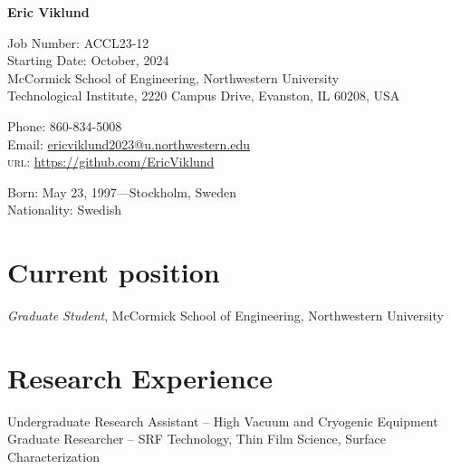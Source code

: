 \documentclass[11pt]{article} %
\begin{document}

{\LARGE\bfseries Eric Viklund} %
\bigskip\medskip %

Job Number: ACCL23-12\\
Starting Date: October, 2024\\

McCormick School of Engineering,  Northwestern University\\ %
Technological Institute, 2220 Campus Drive, Evanston, IL 60208, USA
\medskip %

Phone: 860-834-5008\\ %
Email: \href{mailto:ericviklund2023@u.northwestern.edu}{ericviklund2023@u.northwestern.edu}\\ %
\textsc{url}: \href{https://github.com/EricViklund}{https://github.com/EricViklund} %

\medskip  %


Born: May 23, 1997---Stockholm, Sweden\\ %
Nationality: Swedish %


\section*{Current position}

\emph{Graduate Student}, McCormick School of Engineering,  Northwestern University %


\section*{Research Experience}

Undergraduate Research Assistant -- High Vacuum and Cryogenic Equipment\\
Graduate Researcher -- SRF Technology, Thin Film Science, Surface Characterization 
\end{document}
